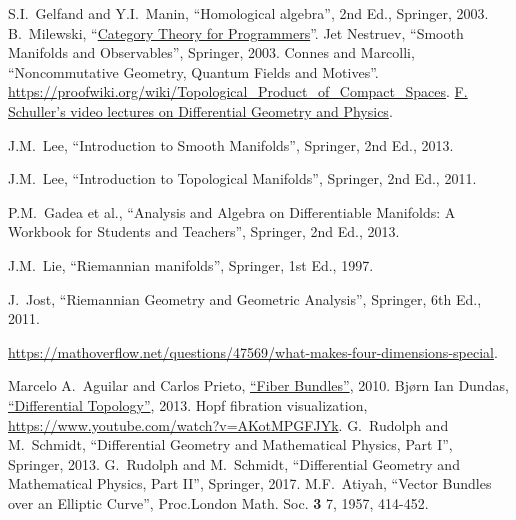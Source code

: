 \begin{thebibliography}{}
    S.I.~Gelfand and Y.I.~Manin, ``Homological algebra'', 2nd Ed., Springer, 2003.
     B.~Milewski, ``\href{https://github.com/hmemcpy/milewski-ctfp-pdf/}{Category Theory for Programmers}''.
     Jet Nestruev, ``Smooth Manifolds and Observables'', Springer, 2003.
     Connes and Marcolli, ``Noncommutative Geometry, Quantum Fields and Motives''.
     \url{https://proofwiki.org/wiki/Topological_Product_of_Compact_Spaces}.
     \href{https://www.youtube.com/playlist?list=PLPH7f_7ZlzxTi6kS4vCmv4ZKm9u8g5yic}{F. Schuller's video lectures on Differential Geometry and Physics}.
    
    J.M.~Lee, ``Introduction to Smooth Manifolds'', Springer, 2nd Ed., 2013.
    
    J.M.~Lee, ``Introduction to Topological Manifolds'', Springer, 2nd Ed., 2011. 
    
     P.M.~Gadea et al., ``Analysis and Algebra on Differentiable Manifolds: A Workbook for Students and Teachers'', Springer, 2nd Ed., 2013.
    
    J.M.~Lie, ``Riemannian manifolds'', Springer, 1st Ed., 1997.
    
     J.~Jost, ``Riemannian Geometry and Geometric Analysis'', Springer, 6th Ed., 2011.
    
    
     \url{https://mathoverflow.net/questions/47569/what-makes-four-dimensions-special}.
    
     Marcelo A.~Aguilar and Carlos Prieto, \href{https://paginas.matem.unam.mx/cprieto/phocadownloadpap/fiber%20bundles.pdf}{``Fiber Bundles''}, 2010.
     Bj{\o}rn Ian Dundas, \href{https://citeseerx.ist.psu.edu/document?repid=rep1&type=pdf&doi=0603e3854c4dc13a2a283072ef834b05e8eec607}{``Differential Topology''}, 2013.
     Hopf fibration visualization, \url{https://www.youtube.com/watch?v=AKotMPGFJYk}.
     G.~Rudolph and M.~Schmidt, ``Differential Geometry and Mathematical Physics, Part I'', Springer, 2013.
     G.~Rudolph and M.~Schmidt, ``Differential Geometry and Mathematical Physics, Part II'', Springer, 2017.
     M.F.~Atiyah, ``Vector Bundles over an Elliptic Curve'', Proc.London Math. Soc. \textbf{3} 7, 1957, 414-452.
    

\end{thebibliography}
